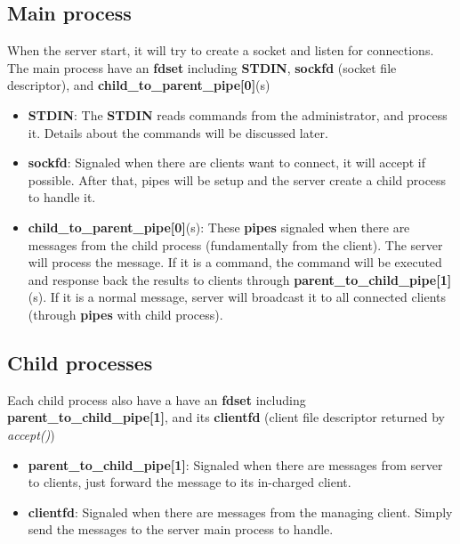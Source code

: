 \documentclass[12pt]{article}
\begin{document}
\subsection{Main process}

When the server start, it will try to create a socket and listen for connections. The main process have an \textbf{fdset} including \textbf{STDIN}, \textbf{sockfd} (socket file descriptor), and \textbf{child\_to\_parent\_pipe[0]}(s)

\begin{itemize}
\item \textbf{STDIN}: The \textbf{STDIN} reads commands from the administrator, and process it. Details about the commands will be discussed later.

\item \textbf{sockfd}: Signaled when there are clients want to connect, it will accept if possible. After that, pipes will be setup and the server create a child process to handle it.

\item \textbf{child\_to\_parent\_pipe[0]}(s): These \textbf{pipes} signaled when there are messages from the child process (fundamentally from the client). The server will process the message. If it is a command, the command will be executed and response back the results to clients through \textbf{parent\_to\_child\_pipe[1]}(s). If it is a normal message, server will broadcast it to all connected clients (through \textbf{pipes} with child process).
\end{itemize}

\subsection{Child processes}

Each child process also have a have an \textbf{fdset} including \textbf{parent\_to\_child\_pipe[1]}, and its \textbf{clientfd} (client file descriptor returned by \textit{accept()})

\begin{itemize}
\item \textbf{parent\_to\_child\_pipe[1]}: Signaled when there are messages from server to clients, just forward the message to its in-charged client.

\item \textbf{clientfd}: Signaled when there are messages from the managing client. Simply send the messages to the server main process to handle.
\end{itemize}
\end{document}
